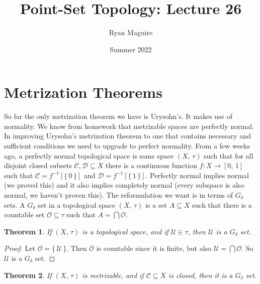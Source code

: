\documentclass{article}
\title{Point-Set Topology: Lecture 26}
\author{Ryan Maguire}
\date{Summer 2022}
\theoremstyle{plain}
\newtheorem{theorem}{Theorem}[section]
\theoremstyle{normal}
\newenvironment{definition}{%
    \pushQED{\qed}\renewcommand{\qedsymbol}{$\blacksquare$}\definitionx%
}{%
    \popQED\enddefinitionx%
}
\begin{document}
    \maketitle
    \section{Metrization Theorems}
        So far the only metrization theorem we have is Urysohn's. It makes use
        of normality. We know from homework that metrizable spaces are
        perfectly normal. In improving Urysohn's metrization theorem to one
        that contains necessary and sufficient conditions we need to upgrade
        to perfect normality. From a few weeks ago, a perfectly normal
        topological space is some space $(X,\,\tau)$ such that for all
        disjoint closed subsets $\mathcal{C},\mathcal{D}\subseteq{X}$ there is
        a continuous function $f:X\rightarrow[0,\,1]$ such that
        $\mathcal{C}=f^{-1}[\{\,0\,\}]$ and $\mathcal{D}=f^{-1}[\{\,1\,\}]$.
        Perfectly normal implies normal (we proved this) and it also implies
        completely normal (every subspace is also normal, we haven't proven
        this). The reformulation we want is in terms of $G_{\delta}$ sets.
        \begin{definition}[\textbf{$G_{\delta}$ Set}]
            A $G_{\delta}$ set in a topological space $(X,\,\tau)$ is a set
            $A\subseteq{X}$ such that there is a countable set
            $\mathcal{O}\subseteq\tau$ such that $A=\bigcap\mathcal{O}$.
        \end{definition}
        \begin{theorem}
            If $(X,\,\tau)$ is a topological space, and if $\mathcal{U}\in\tau$,
            then $\mathcal{U}$ is a $G_{\delta}$ set.
        \end{theorem}
        \begin{proof}
            Let $\mathcal{O}=\{\,\mathcal{U}\,\}$. Then $\mathcal{O}$ is
            countable since it is finite, but also
            $\mathcal{U}=\bigcap\mathcal{O}$. So $\mathcal{U}$ is a
            $G_{\delta}$ set.
        \end{proof}
        \begin{theorem}
            If $(X,\,\tau)$ is metrizable, and if $\mathcal{C}\subseteq{X}$ is
            closed, then it is a $G_{\delta}$ set.
        \end{theorem}
\end{document}

